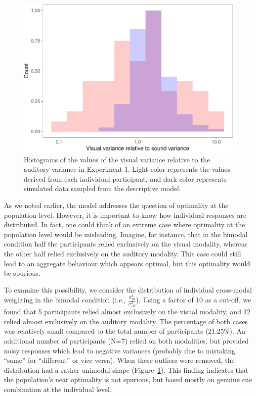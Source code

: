 \documentclass[english,floatsintext,man]{apa6}
\theoremstyle{definition}
\theoremstyle{definition}
\theoremstyle{definition}
\theoremstyle{remark}
\begin{document}
\begin{figure}[!h]
\includegraphics[width=\textwidth]{ms_files/figure-latex/individual-1} \caption{Histograms of the values of the visual variance relative to the auditory variance in Experiment 1. Light color represents the values derived from each individual participant, and dark color represents simulated data sampled from the descriptive model.}\label{fig:individual}
\end{figure}

As we noted earlier, the model addresses the question of optimality at
the population level. However, it is important to know how individual
responses are distributed. In fact, one could think of an extreme case
where optimality at the population level would be misleading. Imagine,
for instance, that in the bimodal condition half the participants relied
exclusively on the visual modality, whereas the other half relied
exclusively on the auditory modality. This case could still lead to an
aggregate behaviour which appears optimal, but this optimality would be
spurious.

To examine this possibility, we consider the distribution of individual
cross-modal weighting in the bimodal condition (i.e.,
\(\frac{\sigma^2_{Vb}}{\sigma^2_{Ab}}\)). Using a factor of 10 as a
cut-off, we found that 5 participants relied almost exclusively on the
visual modality, and 12 relied almost exclusively on the auditory
modality. The percentage of both cases was relatively small compared to
the total number of participants (21.25\%). An additional number of
participants (N=7) relied on both modalities, but provided noisy
responses which lead to negative variances (probably due to mistaking
\enquote{same} for \enquote{different} or vice versa). When these
outliers were removed, the distribution had a rather unimodal shape
(Figure~\ref{fig:individual}). This finding indicates that the
population's near optimality is not spurious, but based mostly on
genuine cue combination at the individual level.
\end{document}
